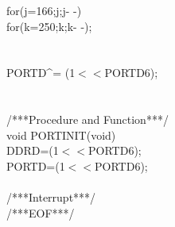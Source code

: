 \documentclass[titlepage, a4paper, 10pt, reqno, openany]{report}
\begin{document}
\begin{minipage}[T]{.3\linewidth}
\hspace*{1.5cm}			for(j=166;j;j- -)\textbraceleft \\
\hspace*{2cm}				for(k=250;k;k- -); \\
\hspace*{1.5cm}			\textbraceright \\
\hspace*{1cm}		\textbraceright \\
\hspace*{1cm}		PORTD\textasciicircum = (1$<<$PORTD6); \\
\hspace*{.5cm}	\textbraceright \\
\textbraceright \\
/***Procedure and Function***/ \\
void PORTINIT(void)\textbraceleft \\
\hspace*{.5cm}	DDRD=(1$<<$PORTD6); \\
\hspace*{.5cm}	PORTD=(1$<<$PORTD6); \\
\textbraceright \\
/***Interrupt***/ \\
/***EOF***/
\end{minipage}
\qquad
\end{document}

